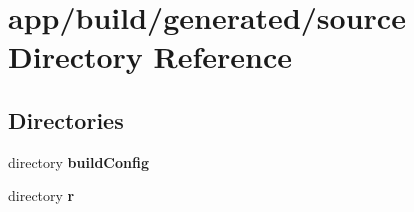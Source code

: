 \section{app/build/generated/source Directory Reference}
\label{dir_5313a251466234e78565b91d4094c22e}
\subsection*{Directories}
\begin{DoxyCompactItemize}
\item 
directory {\bf build\+Config}
\item 
directory {\bf r}
\end{DoxyCompactItemize}
